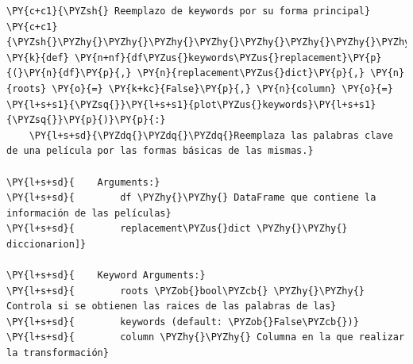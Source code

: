     \begin{tcolorbox}[breakable, size=fbox, boxrule=1pt, pad at break*=1mm,colback=cellbackground, colframe=cellborder]
\begin{Verbatim}[commandchars=\\\{\}]
\PY{c+c1}{\PYZsh{} Reemplazo de keywords por su forma principal}
\PY{c+c1}{\PYZsh{}\PYZhy{}\PYZhy{}\PYZhy{}\PYZhy{}\PYZhy{}\PYZhy{}\PYZhy{}\PYZhy{}\PYZhy{}\PYZhy{}\PYZhy{}\PYZhy{}\PYZhy{}\PYZhy{}\PYZhy{}\PYZhy{}\PYZhy{}\PYZhy{}\PYZhy{}\PYZhy{}\PYZhy{}\PYZhy{}\PYZhy{}\PYZhy{}\PYZhy{}\PYZhy{}\PYZhy{}\PYZhy{}\PYZhy{}\PYZhy{}\PYZhy{}\PYZhy{}\PYZhy{}\PYZhy{}\PYZhy{}\PYZhy{}\PYZhy{}\PYZhy{}\PYZhy{}\PYZhy{}\PYZhy{}\PYZhy{}\PYZhy{}\PYZhy{}\PYZhy{}\PYZhy{}}
\PY{k}{def} \PY{n+nf}{df\PYZus{}keywords\PYZus{}replacement}\PY{p}{(}\PY{n}{df}\PY{p}{,} \PY{n}{replacement\PYZus{}dict}\PY{p}{,} \PY{n}{roots} \PY{o}{=} \PY{k+kc}{False}\PY{p}{,} \PY{n}{column} \PY{o}{=} \PY{l+s+s1}{\PYZsq{}}\PY{l+s+s1}{plot\PYZus{}keywords}\PY{l+s+s1}{\PYZsq{}}\PY{p}{)}\PY{p}{:}
    \PY{l+s+sd}{\PYZdq{}\PYZdq{}\PYZdq{}Reemplaza las palabras clave de una película por las formas básicas de las mismas.}

\PY{l+s+sd}{    Arguments:}
\PY{l+s+sd}{        df \PYZhy{}\PYZhy{} DataFrame que contiene la información de las películas}
\PY{l+s+sd}{        replacement\PYZus{}dict \PYZhy{}\PYZhy{} diccionarion]}

\PY{l+s+sd}{    Keyword Arguments:}
\PY{l+s+sd}{        roots \PYZob{}bool\PYZcb{} \PYZhy{}\PYZhy{} Controla si se obtienen las raices de las palabras de las}
\PY{l+s+sd}{        keywords (default: \PYZob{}False\PYZcb{})}
\PY{l+s+sd}{        column \PYZhy{}\PYZhy{} Columna en la que realizar la transformación}


\end{Verbatim}
\end{tcolorbox}
